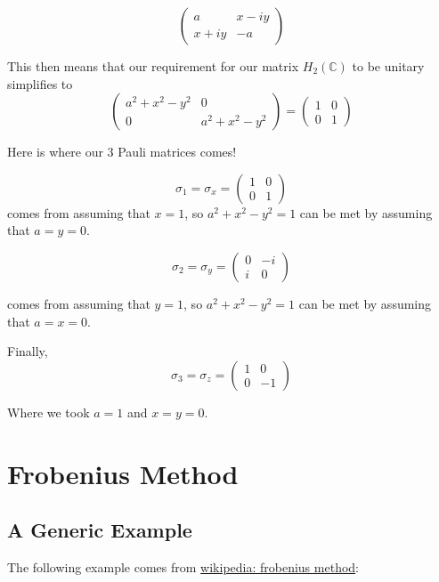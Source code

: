 $$
\begin{pmatrix}
a      & x - iy \\
x + iy & -a
\end{pmatrix}
$$

This then means that our requirement for our matrix $H_2 (\mathbb{C})$ to be unitary simplifies to
$$
\begin{pmatrix}
a^2 + x^2 - y^2 & 0                \\
0               & a^2 + x^2 - y^2
\end{pmatrix}
=
\begin{pmatrix}
1 & 0 \\
0 & 1
\end{pmatrix}
$$

Here is where our 3 Pauli matrices comes!

$$
\sigma_1 = \sigma_x =  
\begin{pmatrix}
1 & 0 \\
0 & 1
\end{pmatrix}
$$
comes from assuming that $x=1$, so $a^2 + x^2 - y^2 = 1$ can be met by assuming that $a = y = 0$.

$$
\sigma_2 = \sigma_y =  
\begin{pmatrix}
0 & -i \\
i & 0
\end{pmatrix}
$$

comes from assuming that $y=1$, so $a^2 + x^2 - y^2 = 1$ can be met by assuming that $a = x = 0$.

Finally,
$$
\sigma_3 = \sigma_z =  
\begin{pmatrix}
1 & 0 \\
0 & -1
\end{pmatrix}
$$

Where we took $a=1$ and $x = y = 0$.





\section{Frobenius Method}

\subsection{A Generic Example}

The following example comes from
\href{https://en.wikipedia.org/wiki/Frobenius_method}{wikipedia: frobenius method}:

